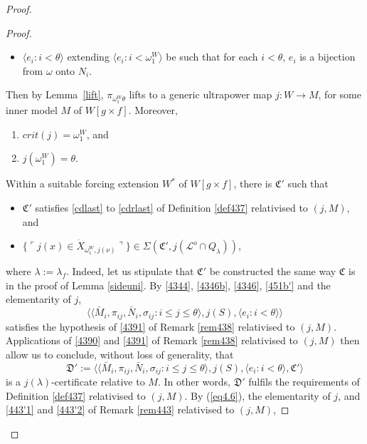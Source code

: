 \documentclass[12pt]{article}
\numberwithin{equation}{section}
\begin{document}
\begin{proof}
\begin{proof}
\begin{itemize}
    \item $\langle e_i : i < \theta \rangle$ extending $\langle e_i : i < \omega_1^W \rangle$ be such that for each $i < \theta$, $e_i$ is a bijection from $\omega$ onto $N_i$.
\end{itemize}
Then by Lemma~\ref{lift}, $\pi_{\omega_1^W\theta}$ lifts to a generic ultrapower map $j : W \longrightarrow M$, for some inner model $M$ of $W[g \times f]$. Moreover, 
\begin{enumerate}[label=(\alph*)]
    \item\label{451a'} $crit(j) = \omega_1^W$, and
    \item\label{451b'} $j(\omega_1^W) = \theta$.
\end{enumerate}

Within a suitable forcing extension $W^*$ of $W[g \times f]$, there is $\mathfrak{C}'$ such that 
\begin{itemize}
    \item $\mathfrak{C}'$ satisfies \ref{cdlast} to \ref{cdrlast} of Definition \ref{def437} relativised to $(j, M)$, and
    \item $\{\ulcorner j(x) \in \dot{X}_{\omega_1^W, j(\nu)} \urcorner\} \in \Sigma(\mathfrak{C}', j(\mathcal{L}^o \cap Q_{\lambda}))$,
\end{itemize} 
where $\lambda := \lambda_f$. Indeed, let us stipulate that $\mathfrak{C}'$ be constructed the same way $\mathfrak{C}$ is in the proof of Lemma \ref{sideuni}. By \ref{4344}, \ref{4346b}, \ref{4346}, \ref{451b'} and the elementarity of $j$, 
\begin{equation*}
    \langle \langle \bar{M}_i, \pi_{ij}, \bar{N}_i, \sigma_{ij} : i \leq j \leq \theta \rangle, j(S), \langle e_i : i < \theta \rangle \rangle
\end{equation*}
satisfies the hypothesis of \ref{4391} of Remark \ref{rem438} relativised to $(j, M)$. Applications of \ref{4390} and \ref{4391} of Remark \ref{rem438} relativised to $(j, M)$ then allow us to conclude, without loss of generality, that
\begin{equation*}
    \mathfrak{D}' := \langle \langle \bar{M}_i, \pi_{ij}, \bar{N}_i, \sigma_{ij} : i \leq j \leq \theta \rangle, j(S), \langle e_i : i < \theta \rangle, \mathfrak{C}' \rangle
\end{equation*}
is a $j(\lambda)$-certificate relative to $M$. In other words, $\mathfrak{D}'$ fulfils the requirements of Definition \ref{def437} relativised to $(j, M)$. By (\ref{eq4.6}), the elementarity of $j$, and \ref{443'1} and \ref{443'2} of Remark \ref{rem443} relativised to $(j, M)$, 

\end{proof}
\end{proof}
\end{document}
